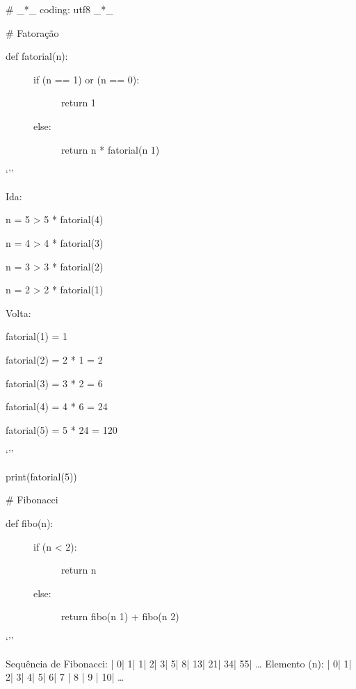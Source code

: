 \documentclass[letterpaper,10pt,brazil]{sphinxmanual}
\begin{document}
\# \_*\_ coding: utf\sphinxhyphen{}8 \_*\_

\# Fatoração
\begin{description}
\item[{def fatorial(n):}] \leavevmode\begin{description}
\item[{if (n == 1) or (n == 0):}] \leavevmode
return 1

\item[{else:}] \leavevmode
return n * fatorial(n \sphinxhyphen{} 1)

\end{description}

\end{description}

‘’’

Ida:

n = 5 \sphinxhyphen{}\textgreater{} 5 * fatorial(4)

n = 4 \sphinxhyphen{}\textgreater{} 4 * fatorial(3)

n = 3 \sphinxhyphen{}\textgreater{} 3 * fatorial(2)

n = 2 \sphinxhyphen{}\textgreater{} 2 * fatorial(1)

Volta:

fatorial(1) = 1

fatorial(2) = 2 * 1 = 2

fatorial(3) = 3 * 2 = 6

fatorial(4) = 4 * 6 = 24

fatorial(5) = 5 * 24 = 120

‘’’

print(fatorial(5))

\# Fibonacci
\begin{description}
\item[{def fibo(n):}] \leavevmode\begin{description}
\item[{if (n \textless{} 2):}] \leavevmode
return n

\item[{else:}] \leavevmode
return fibo(n \sphinxhyphen{} 1) + fibo(n \sphinxhyphen{} 2)

\end{description}

\end{description}

‘’’

Sequência de Fibonacci: | 0| 1| 1| 2| 3| 5| 8| 13| 21| 34| 55| …
Elemento (n):           | 0| 1| 2| 3| 4| 5| 6| 7 | 8 | 9 | 10| …
\end{document}
